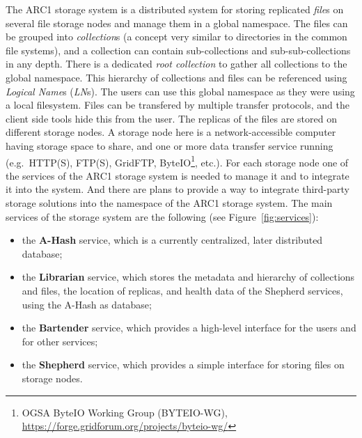 \documentclass{book}
\begin{document}
The ARC1 storage system is a distributed system for storing replicated \emph{file}s on several file storage nodes and manage them in a global namespace.  The files can be grouped into \emph{collection}s (a concept very similar to directories in the common file systems), and a collection can contain sub-collections and sub-sub-collections in any depth. There is a dedicated \emph{root collection} to gather all collections to the global namespace. This hierarchy of collections and files can be referenced using \emph{Logical Name}s (\emph{LN}s). The users can use this global namespace  as they were using a local filesystem. Files can be transfered by multiple transfer protocols, and the client side tools hide this from the user. The replicas of the files are stored on different storage nodes. A storage node here is a network-accessible computer having storage space to share, and one or more data transfer service running (e.g.~HTTP(S), FTP(S), GridFTP, ByteIO\footnote{OGSA ByteIO Working Group (BYTEIO-WG), \url{https://forge.gridforum.org/projects/byteio-wg/}}, etc.). For each storage node one of the services of the ARC1 storage system is needed to manage it and to integrate it into the system. And there are plans to provide a way to integrate third-party storage solutions into the namespace of the ARC1 storage system. The main services of the storage system are the following (see Figure~\ref{fig:services}):
\begin{itemize}
    \item the \textbf{A-Hash} service, which is a currently centralized, later distributed database;
    \item the \textbf{Librarian} service, which stores the metadata and hierarchy of collections and files, the location of replicas, and health data of the Shepherd services, using the A-Hash as database;
    \item the \textbf{Bartender} service, which provides a high-level interface for the users and for other services;
    \item the \textbf{Shepherd} service, which provides a simple interface for storing files on storage nodes.
\end{itemize}
\end{document}
